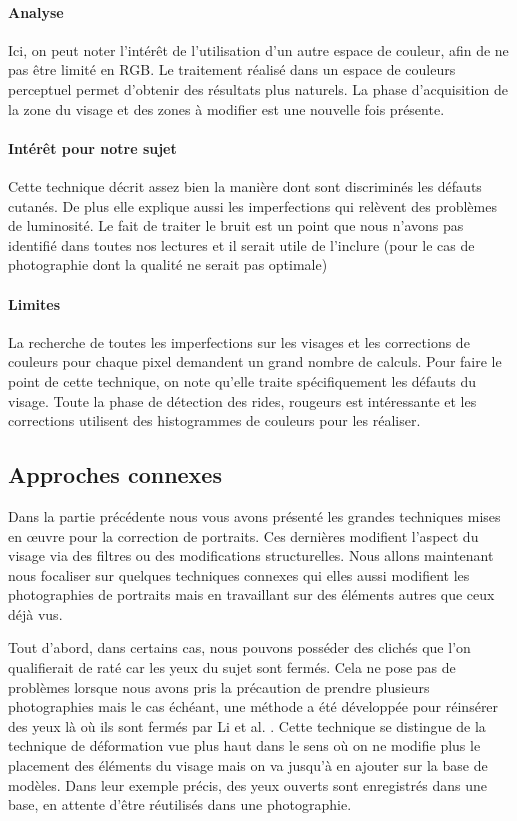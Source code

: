 \documentclass[11pt, french,screen]{report-rd-info}
\begin{document}
\paragraph{Analyse}
Ici, on peut noter l'intérêt de l'utilisation d'un autre espace de couleur, afin de ne pas être limité en RGB. Le traitement réalisé dans un espace de couleurs perceptuel permet d'obtenir des résultats plus naturels. La phase d'acquisition de la zone du visage et des zones à modifier est une nouvelle fois présente.
\paragraph{Intérêt pour notre sujet}
Cette technique décrit assez bien la manière dont sont discriminés les défauts cutanés. De plus elle explique aussi les imperfections qui relèvent des problèmes de luminosité. Le fait de traiter le bruit est un point que nous n’avons pas identifié dans toutes nos lectures et il serait utile de l’inclure (pour le cas de photographie dont la qualité ne serait pas optimale)
\paragraph{Limites}
La recherche de toutes les imperfections sur les visages et les corrections de couleurs pour chaque pixel demandent un grand nombre de calculs.
Pour faire le point de cette technique, on note qu’elle traite spécifiquement les défauts du visage. Toute la phase de détection des rides, rougeurs est intéressante et les corrections utilisent des histogrammes de couleurs pour les réaliser.
\subsection{Approches connexes}
Dans la partie précédente nous vous avons présenté les grandes techniques mises en œuvre pour la correction de portraits. Ces dernières modifient l’aspect du visage via des filtres ou des modifications structurelles. Nous allons maintenant nous focaliser sur quelques techniques connexes qui elles aussi modifient les photographies de portraits mais en travaillant sur des éléments autres que ceux déjà vus.

Tout d’abord, dans certains cas, nous pouvons posséder des clichés que l'on qualifierait de raté car les yeux du sujet sont fermés. Cela ne pose pas de problèmes lorsque nous avons pris la précaution de prendre plusieurs photographies mais le cas échéant, une méthode a été développée pour réinsérer des yeux là où ils sont fermés par Li et al. \cite{Li2011}. Cette technique se distingue de la technique de déformation vue plus haut dans le sens où on ne modifie plus le placement des éléments du visage mais on va jusqu'à en ajouter sur la base de modèles. Dans leur exemple précis, des yeux ouverts sont enregistrés dans une base, en attente d’être réutilisés dans une photographie.
\end{document}

